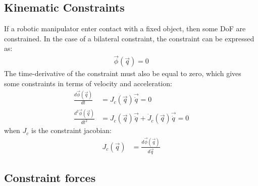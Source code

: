 \subsection{Kinematic Constraints}
\label{sec:constraints}
%
If a robotic manipulator enter contact with a fixed object, then some DoF are constrained. In the case of a bilateral constraint, the constraint can be expressed as:
\begin{align}
\vec{\phi}( \vec{ q } ) = 0
\label{eq:constraint}
\end{align}
%
The time-derivative of the constraint must also be equal to zero, which gives some constraints in terms of velocity and acceleration:
\begin{align}
\frac{d \vec{\phi}( \vec{ q } ) }{dt}     &= J_c( \vec{ q } ) \vec{\dot{q}}  = 0 \\
\frac{d^2 \vec{\phi}( \vec{ q } ) }{dt^2} &= J_c( \vec{ q } ) \vec{\ddot{q}}  + \dot{J}_c( \vec{ q } ) \vec{\dot{q}} = 0 
\label{eq:constraint_diff}
\end{align}
%
when $J_c$ is the constraint jacobian:
%
\begin{align}
J_c( \vec{ q } )                    &= \frac{d \vec{\phi}( \vec{ q } ) }{d\vec{ q }}
\label{eq:constraint_jaco}
\end{align}

\subsection{Constraint forces}
\label{sec:constraint_forces}

